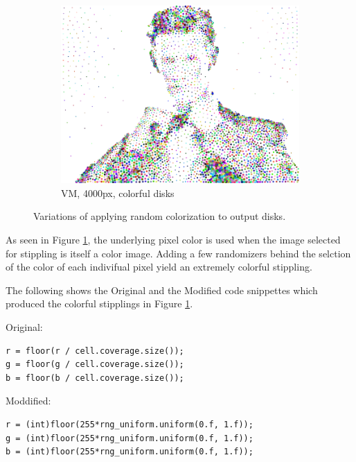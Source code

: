 \documentclass[11pt]{article}
\begin{document}
\begin{figure}[H]
\begin{subfigure}[b]{0.4\linewidth}
		\includegraphics[width=\linewidth]{pix/hc_bowtie-4000_color}
		\caption{VM, 4000px, colorful disks}
	\end{subfigure}
	\caption{Variations of applying random colorization to output disks.}
	\label{fig:bowties}
\end{figure}

As seen in Figure \ref{fig:bowties}, the underlying pixel color is used when the image selected for stippling is itself a color image. Adding a few randomizers behind the selction of the color of each indivifual pixel yield an extremely colorful stippling.

The following shows the Original and the Modified code snippettes which produced the colorful stipplings in Figure \ref{fig:bowties}.

Original:
\begin{lstlisting}
r = floor(r / cell.coverage.size());
g = floor(g / cell.coverage.size());
b = floor(b / cell.coverage.size());
\end{lstlisting}

Moddified:
\begin{lstlisting}
r = (int)floor(255*rng_uniform.uniform(0.f, 1.f));
g = (int)floor(255*rng_uniform.uniform(0.f, 1.f));
b = (int)floor(255*rng_uniform.uniform(0.f, 1.f));
\end{lstlisting}



\end{document}
